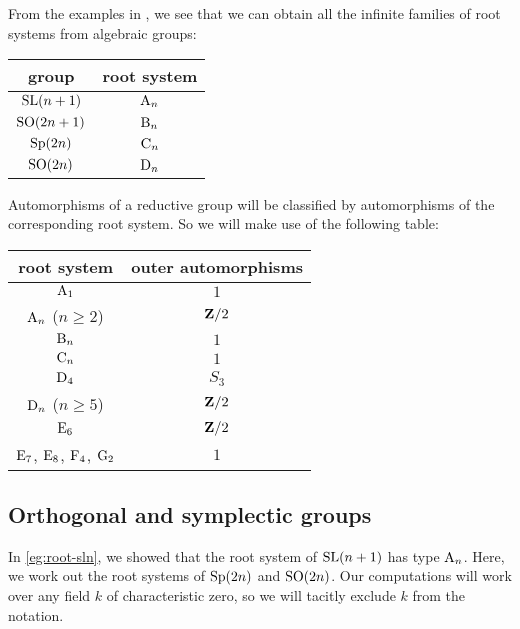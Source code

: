 From the examples in \cite[Ch.23]{milne-iAG}, we see that we can obtain all 
the infinite families of root systems from algebraic groups:
\begin{center}
\begin{tabular}{c|c}
  group & root system \\ \hline
  $\operatorname{SL}(n+1)$  & $\mathrm{A}_n$ \\
  $\operatorname{SO}(2n+1)$ & $\mathrm{B}_n$ \\
  $\operatorname{Sp}(2n)$   & $\mathrm{C}_n$ \\
  $\operatorname{SO}(2n)$   & $\mathrm{D}_n$ 
\end{tabular}
\end{center}

Automorphisms of a reductive group will be classified by automorphisms of the 
corresponding root system. So we will make use of the following table:
\begin{center}
\begin{tabular}{c|c}
  root system                 & outer automorphisms \\ \hline
  $\mathrm{A}_1$                  & $1$ \\
  $\mathrm{A}_n$ ($n\geqslant 2$) & $\mathbf{Z}/2$  \\
  $\mathrm{B}_n$                  & $1$ \\
  $\mathrm{C}_n$                  & $1$ \\
  $\mathrm{D}_4$                  & $S_3$ \\
  $\mathrm{D}_n$ ($n\geqslant 5$) & $\mathbf{Z}/2$ \\
  $\mathrm{E}_6$                  & $\mathbf{Z}/2$ \\
  $\mathrm{E}_7$, $\mathrm{E}_8$, $\mathrm{F}_4$, $\mathrm{G}_2$ & $1$
\end{tabular}
\end{center}





\subsection{Orthogonal and symplectic groups}

In \autoref{eg:root-sln}, we showed that the root system of $\operatorname{SL}(n+1)$ has type 
$\mathrm{A}_n$. Here, we work out the root systems of $\operatorname{Sp}(2n)$ and $\operatorname{SO}(2n)$. Our 
computations will work over any field $k$ of characteristic zero, so we will 
tacitly exclude $k$ from the notation. 



